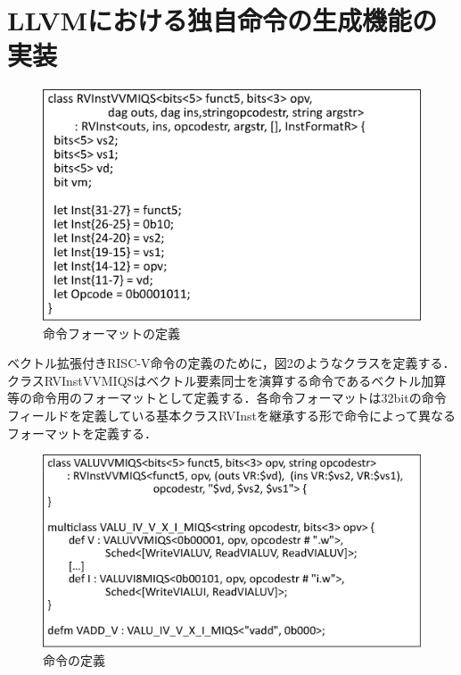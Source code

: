 \documentclass[a4paper,9pt, twocolumn]{jarticle}
\begin{document}
\section{LLVMにおける独自命令の生成機能の実装}

\begin{figure}[t]
    \centering
    \includegraphics[scale=0.35]{RVInstVVMIQS.eps}
    \vspace{-1truemm}
    \caption{命令フォーマットの定義}
    \vspace{-2truemm}
    \label{fig:Instruciton_format}
\end{figure}

ベクトル拡張付きRISC-V命令の定義のために，図2のようなクラスを定義する．クラスRVInstVVMIQSはベクトル要素同士を演算する命令であるベクトル加算等の命令用のフォーマットとして定義する．各命令フォーマットは32bitの命令フィールドを定義している基本クラスRVInstを継承する形で命令によって異なるフォーマットを定義する．

\begin{figure}[t]
    \centering
    \includegraphics[scale=0.35]{Instruction.eps}
    \vspace{-7truemm}
    \caption{命令の定義}
    \vspace{-4truemm}
    \label{fig:Instruciton}
\end{figure}
\end{document}
